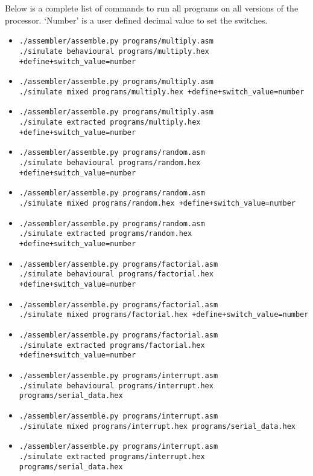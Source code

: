 Below is a complete list of commands to run all programs on all versions of the processor.
`Number' is a user defined decimal value to set the switches.
\begin{itemize}
\item \texttt{./assembler/assemble.py programs/multiply.asm \\ ./simulate behavioural programs/multiply.hex +define+switch\_value=number}
\item \texttt{./assembler/assemble.py programs/multiply.asm \\ ./simulate mixed programs/multiply.hex +define+switch\_value=number}
\item \texttt{./assembler/assemble.py programs/multiply.asm \\ ./simulate extracted programs/multiply.hex +define+switch\_value=number}\\

\item \texttt{./assembler/assemble.py programs/random.asm \\ ./simulate behavioural programs/random.hex +define+switch\_value=number}
\item \texttt{./assembler/assemble.py programs/random.asm \\ ./simulate mixed programs/random.hex +define+switch\_value=number}
\item \texttt{./assembler/assemble.py programs/random.asm \\ ./simulate extracted programs/random.hex +define+switch\_value=number}\\

\item \texttt{./assembler/assemble.py programs/factorial.asm \\ ./simulate behavioural programs/factorial.hex +define+switch\_value=number}
\item \texttt{./assembler/assemble.py programs/factorial.asm \\ ./simulate mixed programs/factorial.hex +define+switch\_value=number}
\item \texttt{./assembler/assemble.py programs/factorial.asm \\ ./simulate extracted programs/factorial.hex +define+switch\_value=number}\\

\item \texttt{./assembler/assemble.py programs/interrupt.asm \\ ./simulate behavioural programs/interrupt.hex programs/serial\_data.hex}
\item \texttt{./assembler/assemble.py programs/interrupt.asm \\ ./simulate mixed programs/interrupt.hex programs/serial\_data.hex}
\item \texttt{./assembler/assemble.py programs/interrupt.asm \\ ./simulate extracted programs/interrupt.hex programs/serial\_data.hex}
\end{itemize}

